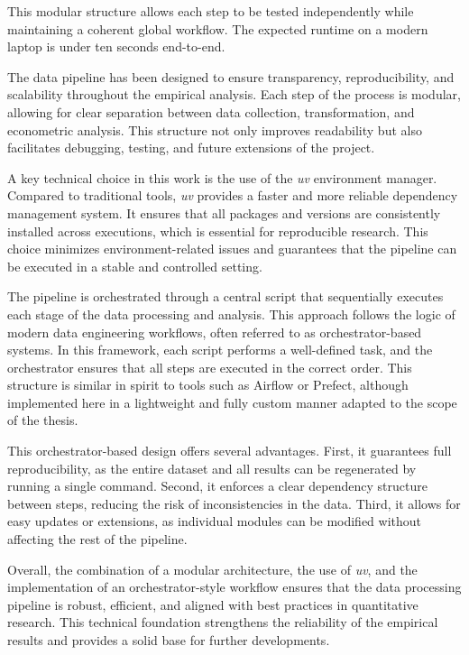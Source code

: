 \documentclass[11pt,a4paper,openany]{report}
\begin{document}
This modular structure allows each step to be tested independently
while maintaining a coherent global workflow. The expected runtime on
a modern laptop is under ten seconds end-to-end.

The data pipeline has been designed to ensure transparency,
reproducibility, and scalability throughout the empirical analysis. Each
step of the process is modular, allowing for clear separation between
data collection, transformation, and econometric analysis. This
structure not only improves readability but also facilitates debugging,
testing, and future extensions of the project.

A key technical choice in this work is the use of the \emph{uv}
environment manager. Compared to traditional tools, \emph{uv} provides a
faster and more reliable dependency management system. It ensures that
all packages and versions are consistently installed across executions,
which is essential for reproducible research. This choice minimizes
environment-related issues and guarantees that the pipeline can be
executed in a stable and controlled setting.

The pipeline is orchestrated through a central script that sequentially
executes each stage of the data processing and analysis. This approach
follows the logic of modern data engineering workflows, often referred
to as orchestrator-based systems. In this framework, each script
performs a well-defined task, and the orchestrator ensures that all
steps are executed in the correct order. This structure is similar in
spirit to tools such as Airflow or Prefect, although implemented here in
a lightweight and fully custom manner adapted to the scope of the
thesis.

This orchestrator-based design offers several advantages. First, it
guarantees full reproducibility, as the entire dataset and all results
can be regenerated by running a single command. Second, it enforces a
clear dependency structure between steps, reducing the risk of
inconsistencies in the data. Third, it allows for easy updates or
extensions, as individual modules can be modified without affecting the
rest of the pipeline.

Overall, the combination of a modular architecture, the use of
\emph{uv}, and the implementation of an orchestrator-style workflow
ensures that the data processing pipeline is robust, efficient, and
aligned with best practices in quantitative research. This technical
foundation strengthens the reliability of the empirical results and
provides a solid base for further developments.

\cleardoublepage
\nocite{*}

\end{document}
